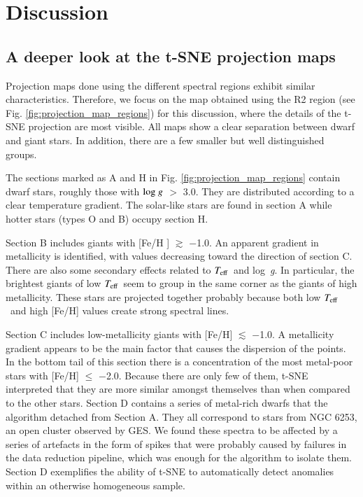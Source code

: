 \documentclass{aa}
\def\teff{$\textit{T}_{\rm{eff}}$}
\def\logg{\mbox{log~{\it g}}}
\begin{document}
\section{Discussion}
\label{sec:results}



\subsection{A deeper look at the t-SNE projection maps}

Projection maps done using the different spectral regions exhibit similar characteristics. Therefore, we focus on the map obtained using the R2 region (see Fig. \ref{fig:projection_map_regions}) for this discussion, where the details of the t-SNE projection are most visible. All maps show a clear separation between dwarf and giant stars. In addition, there are a few smaller but well distinguished groups. 

The sections marked as A and H in Fig. \ref{fig:projection_map_regions} contain dwarf stars, roughly those with $\logg$ $>$ 3.0. They are distributed according to a clear temperature gradient. The solar-like stars are found in section A while hotter stars (types O and B) occupy section H.
    
Section B includes giants with [Fe/H ] $\gtrsim$ $-$1.0. An apparent gradient in metallicity is identified, with values decreasing toward the direction of section C. There are also some secondary effects related to \teff\ and \logg. In particular, the brightest giants of low \teff\ seem to group in the same corner as the giants of high metallicity. These stars are projected together probably because both low \teff\ and high [Fe/H] values create strong spectral lines.

Section C includes low-metallicity giants with [Fe/H] $\lesssim$ $-$1.0. A metallicity gradient appears to be the main factor that causes the dispersion of the points. In the bottom tail of this section there is a concentration of the most metal-poor stars with [Fe/H] $\leq$ $-$2.0. Because there are only few of them, t-SNE interpreted that they are more similar amongst themselves than when compared to the other stars.  
Section D contains a series of metal-rich dwarfs that the algorithm detached from Section A. They all correspond to stars from NGC 6253, an open cluster observed by GES. We found these spectra to be affected by a series of artefacts in the form of spikes that were probably caused by failures in the data reduction pipeline, which was enough for the algorithm to isolate them. Section D exemplifies the ability of t-SNE to automatically detect anomalies within an otherwise homogeneous sample. 
\end{document}
